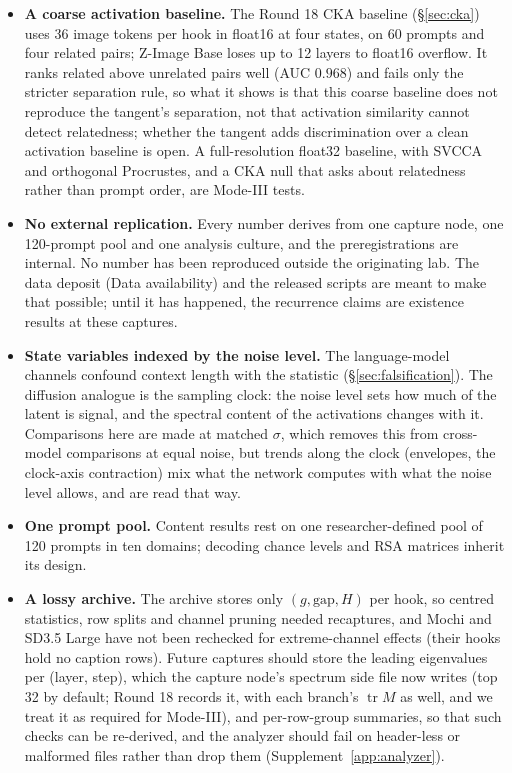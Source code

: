 \documentclass[11pt]{article}
\newcommand{\gap}{\mathrm{gap}}
\begin{document}
\begin{itemize}
 \item \textbf{A coarse activation baseline.} The Round 18 CKA baseline (\S\ref{sec:cka}) uses 36 image tokens per hook in float16 at four states, on 60 prompts and four related pairs; Z-Image Base loses up to 12 layers to float16 overflow. It ranks related above unrelated pairs well (AUC $0.968$) and fails only the stricter separation rule, so what it shows is that this coarse baseline does not reproduce the tangent's separation, not that activation similarity cannot detect relatedness; whether the tangent adds discrimination over a clean activation baseline is open. A full-resolution float32 baseline, with SVCCA \citep{raghu2017svcca} and orthogonal Procrustes, and a CKA null that asks about relatedness rather than prompt order, are Mode-III tests.
 \item \textbf{No external replication.} Every number derives from one capture node, one 120-prompt pool and one analysis culture, and the preregistrations are internal. No number has been reproduced outside the originating lab. The data deposit (Data availability) and the released scripts are meant to make that possible; until it has happened, the recurrence claims are existence results at these captures.
 \item \textbf{State variables indexed by the noise level.} The language-model channels confound context length with the statistic (\S\ref{sec:falsification}). The diffusion analogue is the sampling clock: the noise level sets how much of the latent is signal, and the spectral content of the activations changes with it. Comparisons here are made at matched $\sigma$, which removes this from cross-model comparisons at equal noise, but trends along the clock (envelopes, the clock-axis contraction) mix what the network computes with what the noise level allows, and are read that way.
 \item \textbf{One prompt pool.} Content results rest on one researcher-defined pool of 120 prompts in ten domains; decoding chance levels and RSA matrices inherit its design.
 \item \textbf{A lossy archive.} The archive stores only $(g,\gap,H)$ per hook, so centred statistics, row splits and channel pruning needed recaptures, and Mochi and SD3.5 Large have not been rechecked for extreme-channel effects (their hooks hold no caption rows). Future captures should store the leading eigenvalues per (layer, step), which the capture node's spectrum side file now writes (top 32 by default; Round 18 records it, with each branch's $\operatorname{tr}M$ as well, and we treat it as required for Mode-III), and per-row-group summaries, so that such checks can be re-derived, and the analyzer should fail on header-less or malformed files rather than drop them (Supplement~\ref{app:analyzer}).

\end{itemize}
\end{document}

